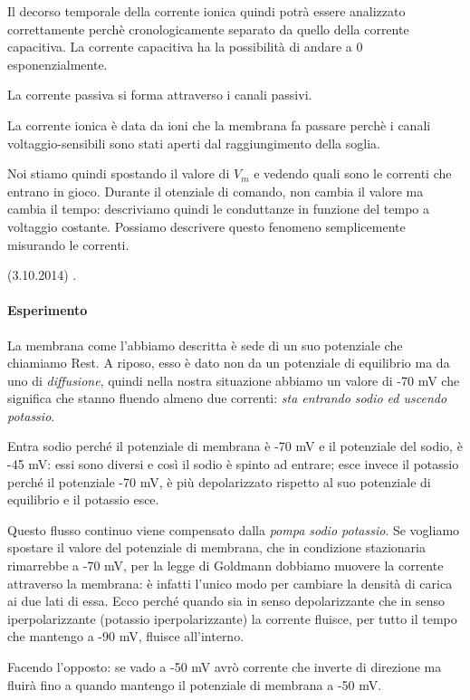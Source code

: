 \documentclass[a4paper,12pt]{article}
\begin{document}
Il decorso temporale della corrente ionica quindi potrà essere analizzato correttamente perchè cronologicamente separato da quello della corrente capacitiva.
La corrente capacitiva ha la possibilità di andare a 0 esponenzialmente.

La corrente passiva si forma attraverso i canali passivi.

La corrente ionica è data da ioni che la membrana fa passare perchè i canali voltaggio-sensibili sono stati aperti dal raggiungimento della soglia.

Noi stiamo quindi spostando il valore di $V_{m}$ e vedendo quali sono le correnti che entrano in gioco. Durante il otenziale di comando, non cambia il valore ma cambia il tempo: descriviamo quindi le conduttanze in funzione del tempo a voltaggio costante. Possiamo descrivere questo fenomeno semplicemente misurando le correnti.

(3.10.2014)
 .
  
\paragraph{Esperimento}

La membrana come l’abbiamo descritta è sede di un suo potenziale che chiamiamo Rest. A riposo, esso è dato non da un potenziale di equilibrio ma da uno di \emph{diffusione}, quindi nella nostra situazione abbiamo un valore di -70 mV che significa che stanno fluendo almeno due correnti: \emph{sta entrando sodio ed uscendo potassio}.

Entra sodio perché il potenziale di membrana è -70 mV e il potenziale del sodio, è -45 mV: essi sono diversi e così il sodio è spinto ad entrare; esce invece il potassio perché il  potenziale -70 mV, è più depolarizzato rispetto al suo potenziale di equilibrio e il potassio esce. 

Questo flusso continuo viene compensato dalla \emph{pompa sodio potassio}. Se vogliamo spostare il valore del potenziale di membrana, che in condizione stazionaria rimarrebbe a -70 mV, per la legge di Goldmann dobbiamo muovere la corrente attraverso la membrana: è infatti l’unico modo per cambiare la densità di carica ai due lati di essa. Ecco perché quando sia in senso depolarizzante che in senso iperpolarizzante (potassio iperpolarizzante) la corrente fluisce, per tutto il tempo che mantengo a -90 mV, fluisce all’interno. 

Facendo l’opposto: se vado a -50 mV avrò corrente che inverte di direzione ma fluirà fino a quando mantengo il potenziale di membrana a -50 mV. 
\end{document}

